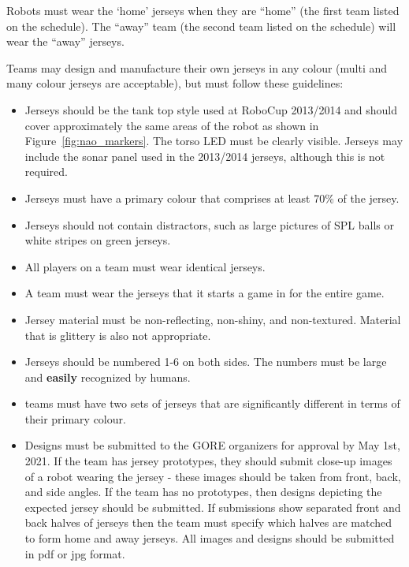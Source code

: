 
Robots must wear the `home' jerseys when they are ``home'' (the first team listed on the schedule). The ``away'' team (the second team listed on the schedule) will wear the ``away'' jerseys.


Teams may design and manufacture their own jerseys in any colour (multi and many colour jerseys are acceptable), but must follow these guidelines:
\begin{itemize}
	\item Jerseys should be the tank top style used at RoboCup 2013/2014 and should cover approximately the same areas of the robot as shown in Figure~\ref{fig:nao_markers}.  The torso LED must be clearly visible.  Jerseys may include the sonar panel used in the 2013/2014 jerseys, although this is not required.
	\item Jerseys must have a primary colour that comprises at least 70\% of the jersey.
	\item Jerseys should not contain distractors, such as large pictures of SPL balls or white stripes on green jerseys.
	\item All players on a team must wear identical jerseys.
	\item A team must wear the jerseys that it starts a game in for the entire game.
	\item Jersey material must be non-reflecting, non-shiny, and non-textured.  Material that is glittery is also not appropriate.
	\item Jerseys should be numbered 1-6 on both sides. The numbers must be large and {\bf easily} recognized by humans.
	\item {} teams must have two sets of jerseys that are significantly different in terms of their primary colour.
	\item Designs must be submitted to the GORE organizers for approval by May 1st, 2021. If the team has jersey prototypes, they should submit close-up images of a robot wearing the jersey - these images should be taken from front, back, and side angles. If the team has no prototypes, then designs depicting the expected jersey should be submitted. If submissions show separated front and back halves of jerseys then the team must specify which halves are matched to form home and away jerseys.  All images and designs should be submitted in pdf or jpg format.
\end{itemize}

